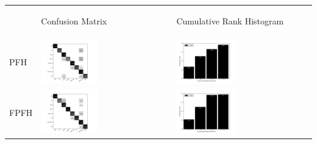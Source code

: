 
\begin{table}
\centering
\begin{tabular}{m{} m{} m{}}
  & \begin{center} Confusion Matrix \end{center} & \begin{center} Cumulative Rank Histogram \end{center} \\
  PFH & \includegraphics[width=0.45\textwidth,clip=true]{../figures/PFH_confmat.png} & \includegraphics[width=0.45\textwidth,clip=true]{../figures/PFH_rankhist.png} \\
  FPFH & \includegraphics[width=0.45\textwidth,clip=true]{../figures/FPFH_confmat.png} & \includegraphics[width=0.45\textwidth,clip=true]{../figures/FPFH_rankhist.png} \\

\end{tabular}
\end{table}
